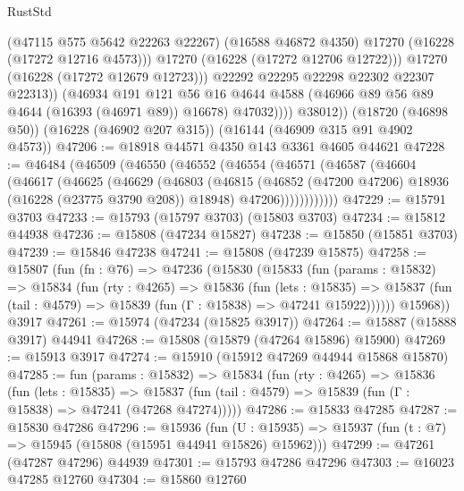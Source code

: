 \begin{lexlean}{RustStd}
\begin{coremodule}
                        (@47115 @575 @5642 @22263 @22267)
                        (@16588 @46872 @4350)
                        @17270
                        (@16228 (@17272 @12716 @4573)))
                      @17270
                      (@16228 (@17272 @12706 @12722)))
                    @17270
                    (@16228 (@17272 @12679 @12723)))
                  @22292
                  @22295
                  @22298
                  @22302
                  @22307
                  @22313))
              (@46934
                @191
                @121
                @56
                @16
                @4644
                @4588
                (@46966 @89 @56 @89 @4644 (@16393 (@46971 @89)) @16678)
                @47032))))
        @38012))
    (@18720 (@46898 @50))
    (@16228 (@46902 @207 @315))
    (@16144 (@46909 @315 @91 @4902 @4573))
@47206 := @18918 @44571 @4350 @143 @3361 @4605 @44621
@47228 := @46484
    (@46509
      (@46550
        (@46552
          (@46554
            (@46571
              (@46587
                (@46604
                  (@46617
                    (@46625
                      (@46629
                        (@46803
                          (@46815
                            (@46852 (@47200 @47206) @18936 (@16228 (@23775 @3790 @208)) @18948)
                            @47206))))))))))))
@47229 := @15791 @3703
@47233 := @15793 (@15797 @3703) (@15803 @3703)
@47234 := @15812 @44938
@47236 := @15808 (@47234 @15827)
@47238 := @15850 (@15851 @3703)
@47239 := @15846 @47238
@47241 := @15808 (@47239 @15875)
@47258 := @15807
    (fun (fn : @76) =>
    @47236
      (@15830
        (@15833
          (fun (params : @15832) =>
          @15834
            (fun (rty : @4265) =>
            @15836
              (fun (lets : @15835) =>
              @15837 (fun (tail : @4579) => @15839 (fun (Γ : @15838) => @47241 @15922))))))
        @15968))
    @3917
@47261 := @15974 (@47234 (@15825 @3917))
@47264 := @15887 (@15888 @3917) @44941
@47268 := @15808 (@15879 (@47264 @15896) @15900)
@47269 := @15913 @3917
@47274 := @15910 (@15912 @47269 @44944 @15868 @15870)
@47285 := fun (params : @15832) =>
  @15834
    (fun (rty : @4265) =>
    @15836
      (fun (lets : @15835) =>
      @15837 (fun (tail : @4579) => @15839 (fun (Γ : @15838) => @47241 (@47268 @47274)))))
@47286 := @15833 @47285
@47287 := @15830 @47286
@47296 := @15936
    (fun (U : @15935) => @15937 (fun (t : @7) => @15945 (@15808 (@15951 @44941 @15826) @15962)))
@47299 := @47261 (@47287 @47296) @44939
@47301 := @15793 @47286 @47296
@47303 := @16023 @47285 @12760
@47304 := @15860 @12760

\end{coremodule}
\end{lexlean}
